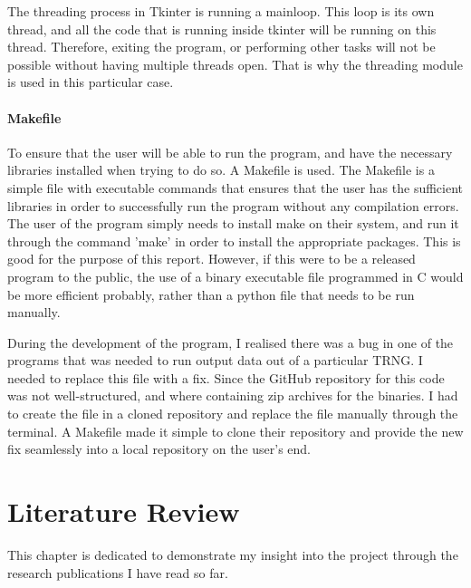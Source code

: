 \documentclass[]{final_report}
\begin{document}
\par{The threading process in Tkinter is running a mainloop. This loop is its own thread, and all the code that is running inside tkinter will be running on this thread. Therefore, exiting the program, or performing other tasks will not be possible without having multiple threads open. That is why the threading module is used in this particular case.}

\subsubsection{Makefile}
\par{To ensure that the user will be able to run the program, and have the necessary libraries installed when trying to do so. A Makefile is used. The Makefile is a simple file with executable commands that ensures that the user has the sufficient libraries in order to successfully run the program without any compilation errors. The user of the program simply needs to install make on their system, and run it through the command 'make' in order to install the appropriate packages. This is good for the purpose of this report. However, if this were to be a released program to the public, the use of a binary executable file programmed in C would be more efficient probably, rather than a python file that needs to be run manually.}

\par{During the development of the program, I realised there was a bug in one of the programs that was needed to run output data out of a particular TRNG. I needed to replace this file with a fix. Since the GitHub repository for this code was not well-structured, and where containing zip archives for the binaries. I had to create the file in a cloned repository and replace the file manually through the terminal. A Makefile made it simple to clone their repository and provide the new fix seamlessly into a local repository on the user's end.}

\chapter*{Literature Review}

\par{This chapter is dedicated to demonstrate my insight into the project through the research publications I have read so far. }
\end{document}
